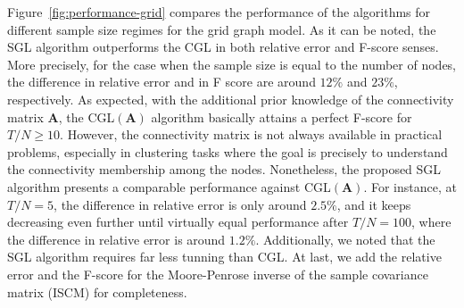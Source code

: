 Figure~\ref{fig:performance-grid} compares the performance of the algorithms for different
sample size regimes for the grid graph model. As it can be noted, the \textsf{SGL} algorithm outperforms the \textsf{CGL}
in both relative error and F-score senses. More precisely, for the case when the sample size is equal
to the number of nodes, the difference in relative error and in F score are around $12\%$ and $23\%$,
respectively. As expected, with the additional prior knowledge of the connectivity matrix $\mathbf{A}$,
the \textsf{CGL}$(\mathbf{A})$ algorithm basically attains a perfect F-score for $T / N \geq 10$.
However, the connectivity matrix is not always available in practical problems, especially in clustering
tasks where the goal is precisely to understand the connectivity membership among the nodes. Nonetheless,
the proposed \textsf{SGL} algorithm presents a comparable performance against \textsf{CGL}$(\mathbf{A})$.
For instance, at $T/N = 5$, the difference in relative error is only around $2.5\%$, and it keeps decreasing
even further until virtually equal performance after $T / N = 100$, where the difference in relative error is around $1.2 \%$.
Additionally, we noted that the \textsf{SGL} algorithm requires far less tunning than \textsf{CGL}.
At last, we add the relative error and the F-score for the Moore-Penrose inverse of the sample covariance matrix
(\textsf{ISCM}) for completeness.

